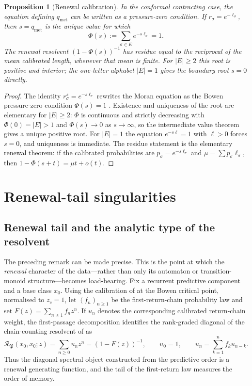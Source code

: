 \documentclass[11pt]{article}
\newtheorem{proposition}[theorem]{Proposition}
\theoremstyle{definition}
\theoremstyle{remark}
\newcommand{\Acc}{\mathcal{R}}
\newcommand{\Pp}{\mathfrak{P}}
\newcommand{\qmet}{q_{\mathrm{met}}}
\begin{document}
\begin{proposition}[Renewal calibration]
\label{prop:renewal-calibration}
In the conformal contracting case, the equation defining $\qmet$ can be written as a pressure-zero condition.  If $r_\sigma=e^{-\ell_\sigma}$, then $s=\qmet$ is the unique value for which
\[
 \Phi(s):=\sum_{\sigma\in E}e^{-s\ell_\sigma}=1.
\]
The renewal resolvent $(1-\Phi(s))^{-1}$ has residue equal to the reciprocal of the mean calibrated length, whenever that mean is finite.
For $|E|\ge2$ this root is positive and interior; the one-letter alphabet
$|E|=1$ gives the boundary root $s=0$ directly.
\end{proposition}

\begin{proof}
The identity $r_\sigma^s=e^{-s\ell_\sigma}$ rewrites the Moran equation as the
Bowen pressure-zero condition $\Phi(s)=1$ \cite{bowen1975,falconertechniques}.
Existence and uniqueness of the root are elementary for $|E|\ge2$: $\Phi$ is
continuous and strictly decreasing with $\Phi(0)=|E|>1$ and
$\Phi(s)\to0$ as $s\to\infty$, so the intermediate value theorem gives a
unique positive root.  For $|E|=1$ the equation $e^{-s\ell}=1$ with
$\ell>0$ forces $s=0$, and uniqueness is immediate.
The residue statement is the elementary renewal theorem: if the calibrated
probabilities are $p_\sigma=e^{-s\ell_\sigma}$ and $\mu=\sum p_\sigma\ell_\sigma$,
then $1-\Phi(s+t)=\mu t+o(t)$.
\end{proof}



\section{Renewal-tail singularities}
\label{app:renewal-tail}

\subsection{Renewal tail and the analytic type of the resolvent}
\label{subsec:renewal-singularity}

The preceding remark can be made precise.  This is the point at which the
\emph{renewal} character of the data---rather than only its automaton or
transition-monoid structure---becomes load-bearing.  Fix a recurrent predictive
component and a base class $x_0$.  Using the calibration of
 at the Bowen critical point, normalised to
$z_c=1$, let $(f_n)_{n\geq1}$ be the first-return-chain probability law and set
$F(z)=\sum_{n\geq1}f_nz^n$.  If $u_n$ denotes the corresponding calibrated
return-chain weight, the first-passage decomposition identifies the rank-graded
diagonal of the chain-counting resolvent of  as
\[
  \Acc_{\Pp}(x_0,x_0;z)=\sum_{n\geq0}u_nz^n=(1-F(z))^{-1},
  \qquad
  u_0=1,\qquad
  u_n=\sum_{k=1}^n f_k u_{n-k}.
\]
Thus the diagonal spectral object constructed from the predictive order is a
renewal generating function, and the tail of the first-return law measures the
order of memory.
\end{document}
